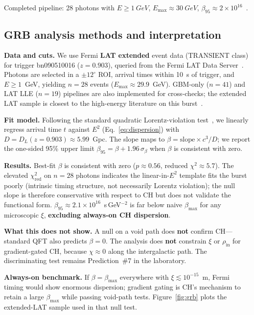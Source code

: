 \documentclass[11pt,a4paper]{article}
\begin{document}
Completed pipeline: 28 photons with $E \geq \SI{1}{GeV}$, $E_{\max} \approx \SI{30}{GeV}$, $\beta_{95} \approx 2\times 10^{16}$~\cite{AmelinoCamelia2009,Vasileiou2013,CHSpaceFabric2026}.

\subsection{GRB analysis methods and interpretation}
\label{sec:grb-methods}

\textbf{Data and cuts.}
We use Fermi \textbf{LAT extended} event data (TRANSIENT class) for trigger bn090510016 ($z=0.903$), queried from the Fermi LAT Data Server~\cite{CHSpaceFabric2026}.
Photons are selected in a $\pm 12^\circ$ ROI, arrival times within 10~s of trigger, and $E \geq 1$~GeV, yielding $n=28$ events ($E_{\max} \approx 29.9$~GeV).
GBM-only ($n=41$) and LAT LLE ($n=19$) pipelines are also implemented for cross-checks; the extended LAT sample is closest to the high-energy literature on this burst~\cite{AmelinoCamelia2009,Vasileiou2013}.

\textbf{Fit model.}
Following the standard quadratic Lorentz-violation test~\cite{AmelinoCamelia2009}, we linearly regress arrival time $t$ against $E^2$ (Eq.~\ref{eq:dispersion}) with $D = D_L(z=0.903) \approx 5.99$~Gpc.
The slope maps to $\beta = \mathrm{slope} \times c^3/D$; we report the one-sided 95\% upper limit $\beta_{95} = \beta + 1.96\,\sigma_\beta$ when $\beta$ is consistent with zero.

\textbf{Results.}
Best-fit $\beta$ is consistent with zero ($p \approx 0.56$, reduced $\chi^2 \approx 5.7$).
The elevated $\chi^2_{\mathrm{red}}$ on $n=28$ photons indicates the linear-in-$E^2$ template fits the burst poorly (intrinsic timing structure, not necessarily Lorentz violation); the null slope is therefore conservative with respect to CH but does not validate the functional form.
$\beta_{95} \approx 2.1\times 10^{16}$~s\,GeV$^{-2}$ is far below naive $\beta_{\max}$ for any microscopic $\xi$, \textbf{excluding always-on CH dispersion}.

\textbf{What this does not show.}
A null on a void path does \textbf{not} confirm CH---standard QFT also predicts $\beta = 0$.
The analysis does \textbf{not} constrain $\xi$ or $\rho_{\mathrm{in}}$ for gradient-gated CH, because $\chi \approx 0$ along the intergalactic path.
The discriminating test remains Prediction~\#7 in the laboratory.

\textbf{Always-on benchmark.}
If $\beta = \beta_{\max}$ everywhere with $\xi \lesssim 10^{-15}$~m, Fermi timing would show enormous dispersion; gradient gating is CH's mechanism to retain a large $\beta_{\max}$ while passing void-path tests.
Figure~\ref{fig:grb} plots the extended-LAT sample used in that null test.
\end{document}
